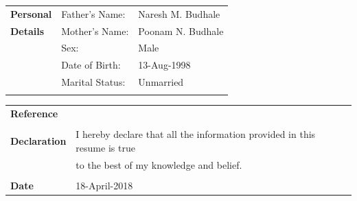 \documentclass[a4paper,11pt,oneside]{article}
\begin{document}
 \noindent
 \vspace{-1.5em}
 \begin{tabular}{@{} p{} p{} p{\textwidth}}
     \textbf{\large{Personal}}           & Father's Name:  & Naresh M. Budhale \\
     \textbf{\large{Details}}            & Mother's Name:  & Poonam N. Budhale \\
                                & Sex:            & Male \\
                                & Date of Birth:  & 13-Aug-1998 \\
                                & Marital Status: & Unmarried \\ \\
 \end{tabular}
 \noindent \begin{tabular}{@{} p{} p{\textwidth}}
     \vspace{1em}
     \textbf{\large{Reference}} & \\ \\
     \textbf{\large{Declaration}}
        & I hereby declare that all the information provided in this resume is true \\
        & to the best of my knowledge and belief. \\ \\
     \textbf{\large{Date}} & 18-April-2018 \\
     
 \end{tabular}

 
 
\clearpage
\end{document}
